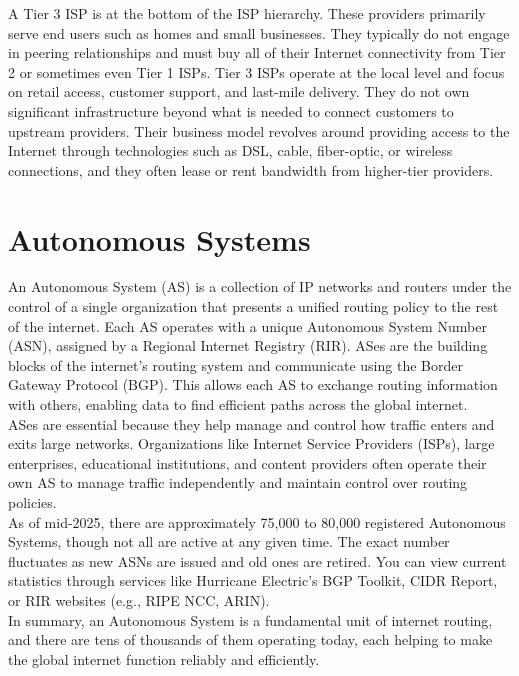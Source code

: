 \documentclass{article}
\begin{document}
A Tier 3 ISP is at the bottom of the ISP hierarchy. These providers primarily serve end users such as homes and small businesses. They typically do not engage in peering relationships and must buy all of their Internet connectivity from Tier 2 or sometimes even Tier 1 ISPs. Tier 3 ISPs operate at the local level and focus on retail access, customer support, and last-mile delivery. They do not own significant infrastructure beyond what is needed to connect customers to upstream providers. Their business model revolves around providing access to the Internet through technologies such as DSL, cable, fiber-optic, or wireless connections, and they often lease or rent bandwidth from higher-tier providers.\\

\section*{Autonomous Systems}
An Autonomous System (AS) is a collection of IP networks and routers under the control of a single organization that presents a unified routing policy to the rest of the internet. Each AS operates with a unique Autonomous System Number (ASN), assigned by a Regional Internet Registry (RIR). ASes are the building blocks of the internet's routing system and communicate using the Border Gateway Protocol (BGP). This allows each AS to exchange routing information with others, enabling data to find efficient paths across the global internet.\\

ASes are essential because they help manage and control how traffic enters and exits large networks. Organizations like Internet Service Providers (ISPs), large enterprises, educational institutions, and content providers often operate their own AS to manage traffic independently and maintain control over routing policies.\\

As of mid-2025, there are approximately 75,000 to 80,000 registered Autonomous Systems, though not all are active at any given time. The exact number fluctuates as new ASNs are issued and old ones are retired. You can view current statistics through services like Hurricane Electric’s BGP Toolkit, CIDR Report, or RIR websites (e.g., RIPE NCC, ARIN).\\

In summary, an Autonomous System is a fundamental unit of internet routing, and there are tens of thousands of them operating today, each helping to make the global internet function reliably and efficiently.\\
\end{document}
